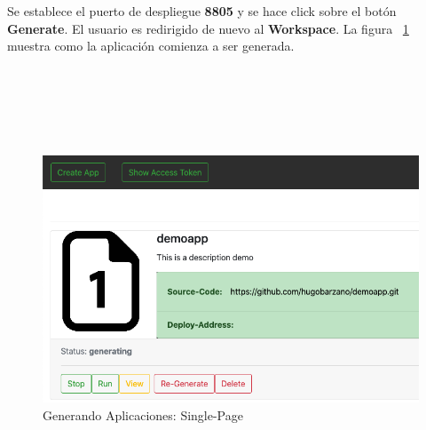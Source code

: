 \documentclass[a4paper,11pt]{book}
\begin{document}
Se establece el puerto de despliegue \textbf{8805} y se hace click sobre el botón \textbf{Generate}.
El usuario es redirigido de nuevo al \textbf{Workspace}. La figura   ~\ref{9} muestra como la aplicación comienza a ser generada. 
~\\
~\\
~\\
~\\
~\\
~\\
\begin{figure}[H]
\centering
\includegraphics[scale=0.5]{imagenes/casouso_a/9.png}
\caption{ Generando Aplicaciones: Single-Page}
\label{9}
\end{figure}
\end{document}

